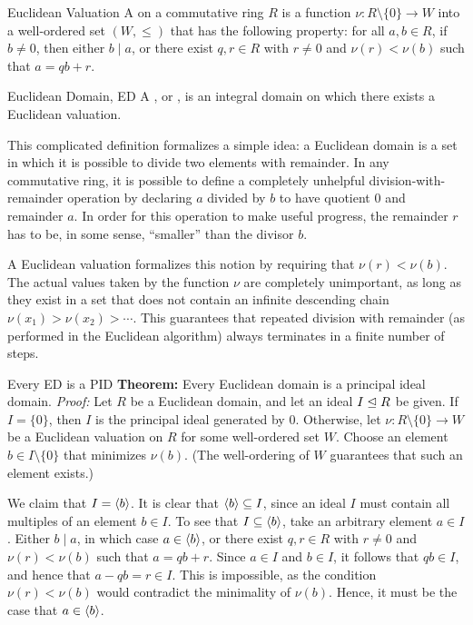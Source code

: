 \begin{dfnbox}{Euclidean Valuation}
	A  on a commutative ring $R$ is a function $\nu: R \setminus \{0\} \to W$ into a well-ordered set $(W, \le)$ that has the following property: for all $a, b \in R$, if $b \ne 0$, then either $b \mid a$, or there exist $q, r \in R$ with $r \ne 0$ and $\nu(r) < \nu(b)$ such that $a = qb + r$.
\end{dfnbox}

\begin{dfnbox}{Euclidean Domain, ED}
	A , or , is an integral domain on which there exists a Euclidean valuation.
\end{dfnbox}

This complicated definition formalizes a simple idea: a Euclidean domain is a set in which it is possible to divide two elements with remainder. In any commutative ring, it is possible to define a completely unhelpful division-with-remainder operation by declaring $a$ divided by $b$ to have quotient $0$ and remainder $a$. In order for this operation to make useful progress, the remainder $r$ has to be, in some sense, ``smaller'' than the divisor $b$.

A Euclidean valuation formalizes this notion by requiring that $\nu(r) < \nu(b)$. The actual values taken by the function $\nu$ are completely unimportant, as long as they exist in a set that does not contain an infinite descending chain $\nu(x_1) > \nu(x_2) > \cdots$. This guarantees that repeated division with remainder (as performed in the Euclidean algorithm) always terminates in a finite number of steps.

\begin{thmbox}{Every ED is a PID}
	\textbf{Theorem:} Every Euclidean domain is a principal ideal domain.
	\tcblower
	\textit{Proof:} Let $R$ be a Euclidean domain, and let an ideal $I \trianglelefteq R$ be given. If $I = \{0\}$, then $I$ is the principal ideal generated by $0$. Otherwise, let $\nu: R \setminus \{0\} \to W$ be a Euclidean valuation on $R$ for some well-ordered set $W$. Choose an element $b \in I \setminus \{0\}$ that minimizes $\nu(b)$. (The well-ordering of $W$ guarantees that such an element exists.)

	We claim that $I = {\langle {b} \rangle}$. It is clear that ${\langle {b} \rangle} \subseteq I$, since an ideal $I$ must contain all multiples of an element $b \in I$. To see that $I \subseteq {\langle {b} \rangle}$, take an arbitrary element $a \in I$. Either $b \mid a$, in which case $a \in {\langle {b} \rangle}$, or there exist $q, r \in R$ with $r \ne 0$ and $\nu(r) < \nu(b)$ such that $a = qb + r$. Since $a \in I$ and $b \in I$, it follows that $qb \in I$, and hence that $a - qb = r \in I$. This is impossible, as the condition $\nu(r) < \nu(b)$ would contradict the minimality of $\nu(b)$. Hence, it must be the case that $a \in {\langle {b} \rangle}$.
\end{thmbox}
